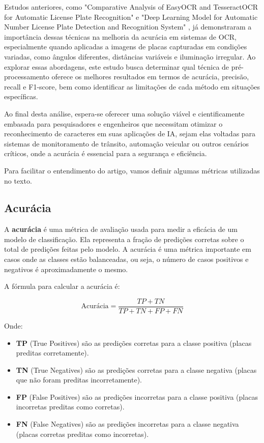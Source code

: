 \documentclass[conference]{IEEEtran}
\begin{document}
Estudos anteriores, como "Comparative Analysis of EasyOCR and TesseractOCR for Automatic License Plate Recognition" \cite{b1} e "Deep Learning Model for Automatic Number License Plate Detection and Recognition System" \cite{b2} , já demonstraram a importância dessas técnicas na melhoria da acurácia em sistemas de OCR, especialmente quando aplicadas a imagens de placas capturadas em condições variadas, como ângulos diferentes, distâncias variáveis e iluminação irregular. Ao explorar essas abordagens, este estudo busca determinar qual técnica de pré-processamento oferece os melhores resultados em termos de acurácia, precisão, recall e F1-score, bem como identificar as limitações de cada método em situações específicas.

Ao final desta análise, espera-se oferecer uma solução viável e cientificamente embasada para pesquisadores e engenheiros que necessitam otimizar o reconhecimento de caracteres em suas aplicações de IA, sejam elas voltadas para sistemas de monitoramento de trânsito, automação veicular ou outros cenários críticos, onde a acurácia é essencial para a segurança e eficiência.

Para facilitar o entendimento do artigo, vamos definir algumas métricas utilizadas no texto.

\subsection{Acurácia}

A \textbf{acurácia} é uma métrica de avaliação usada para medir a eficácia de um modelo de classificação. Ela representa a fração de predições corretas sobre o total de predições feitas pelo modelo. A acurácia é uma métrica importante em casos onde as classes estão balanceadas, ou seja, o número de casos positivos e negativos é aproximadamente o mesmo.

A fórmula para calcular a acurácia é:

\[
\text{Acurácia} = \frac{TP + TN}{TP + TN + FP + FN}
\]

Onde:

\begin{itemize}
	\item \textbf{TP} (True Positives) são as predições corretas para a classe positiva (placas preditas corretamente).
	\item \textbf{TN} (True Negatives) são as predições corretas para a classe negativa (placas que não foram preditas incorretamente).
	\item \textbf{FP} (False Positives) são as predições incorretas para a classe positiva (placas incorretas preditas como corretas).
	\item \textbf{FN} (False Negatives) são as predições incorretas para a classe negativa (placas corretas preditas como incorretas).
\end{itemize}
\end{document}
